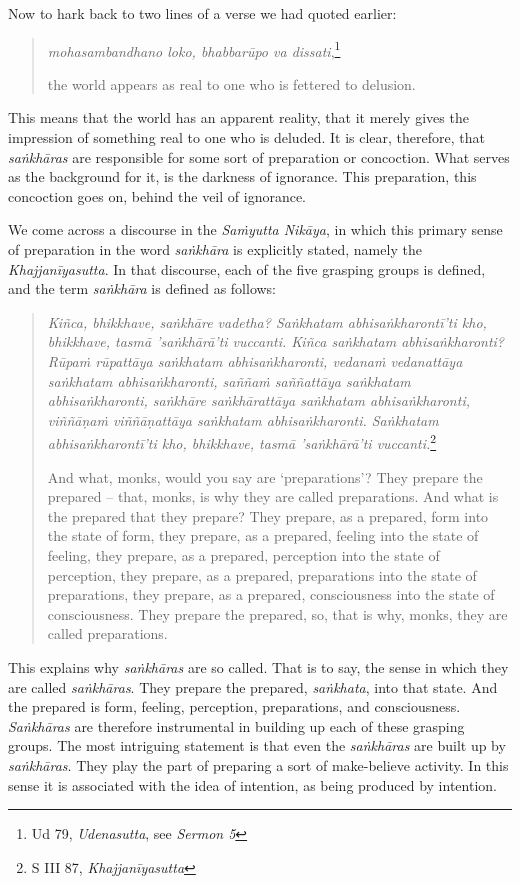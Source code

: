 Now to hark back to two lines of a verse we had quoted earlier:

\begin{quote}
\emph{mohasambandhano loko, bhabbarūpo va dissati},\footnote{Ud 79, \emph{Udenasutta}, see \emph{Sermon 5}}

the world appears as real to one who is fettered to delusion.
\end{quote}

This means that the world has an apparent reality, that it merely gives the impression of something real to one who is deluded. It is clear, therefore, that \emph{saṅkhāras} are responsible for some sort of preparation or concoction. What serves as the background for it, is the darkness of ignorance. This preparation, this concoction goes on, behind the veil of ignorance.

We come across a discourse in the \emph{Saṁyutta Nikāya}, in which this primary sense of preparation in the word \emph{saṅkhāra} is explicitly stated, namely the \emph{Khajjanīyasutta}. In that discourse, each of the five grasping groups is defined, and the term \emph{saṅkhāra} is defined as follows:

\clearpage

\begin{quote}
\emph{Kiñca, bhikkhave, saṅkhāre vadetha? Saṅkhatam abhisaṅkharontī'ti kho, bhikkhave, tasmā 'saṅkhārā'ti vuccanti. Kiñca saṅkhatam abhisaṅkharonti? Rūpaṁ rūpattāya saṅkhatam abhisaṅkharonti, vedanaṁ vedanattāya saṅkhatam abhisaṅkharonti, saññaṁ saññattāya saṅkhatam abhisaṅkharonti, saṅkhāre saṅkhārattāya saṅkhatam abhisaṅkharonti, viññāṇaṁ viññāṇattāya saṅkhatam abhisaṅkharonti. Saṅkhatam abhisaṅkharontī'ti kho, bhikkhave, tasmā 'saṅkhārā'ti vuccanti.}\footnote{S III 87, \emph{Khajjanīyasutta}}

And what, monks, would you say are `preparations'? They prepare the prepared -- that, monks, is why they are called preparations. And what is the prepared that they prepare? They prepare, as a prepared, form into the state of form, they prepare, as a prepared, feeling into the state of feeling, they prepare, as a prepared, perception into the state of perception, they prepare, as a prepared, preparations into the state of preparations, they prepare, as a prepared, consciousness into the state of consciousness. They prepare the prepared, so, that is why, monks, they are called preparations.
\end{quote}

This explains why \emph{saṅkhāras} are so called. That is to say, the sense in which they are called \emph{saṅkhāras}. They prepare the prepared, \emph{saṅkhata}, into that state. And the prepared is form, feeling, perception, preparations, and consciousness. \emph{Saṅkhāras} are therefore instrumental in building up each of these grasping groups. The most intriguing statement is that even the \emph{saṅkhāras} are built up by \emph{saṅkhāras}. They play the part of preparing a sort of make-believe activity. In this sense it is associated with the idea of intention, as being produced by intention.

